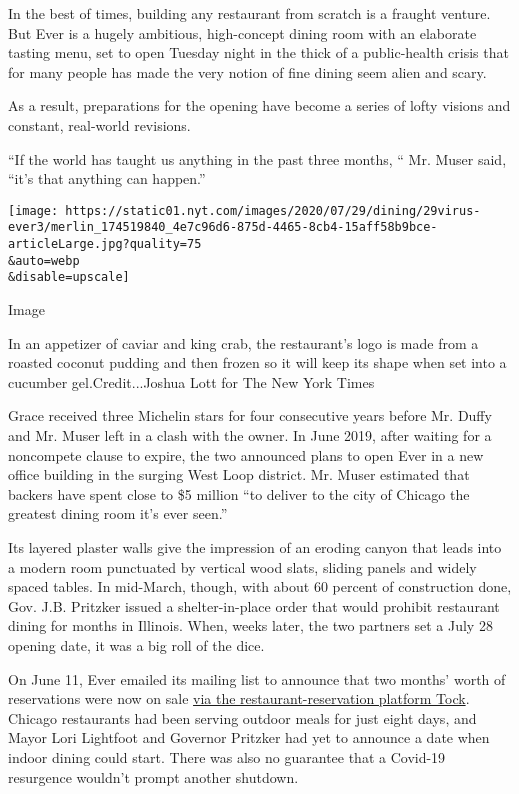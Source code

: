 In the best of times, building any restaurant from scratch is a fraught
venture. But Ever is a hugely ambitious, high-concept dining room with
an elaborate tasting menu, set to open Tuesday night in the thick of a
public-health crisis that for many people has made the very notion of
fine dining seem alien and scary.

As a result, preparations for the opening have become a series of lofty
visions and constant, real-world revisions.

``If the world has taught us anything in the past three months, `` Mr.
Muser said, ``it's that anything can happen.''

\texttt{[image: https://static01.nyt.com/images/2020/07/29/dining/29virus-ever3/merlin\_174519840\_4e7c96d6-875d-4465-8cb4-15aff58b9bce-articleLarge.jpg?quality=75\\\&auto=webp\\\&disable=upscale]}

Image

In an appetizer of caviar and king crab, the restaurant's logo is made
from a roasted coconut pudding and then frozen so it will keep its shape
when set into a cucumber gel.Credit...Joshua Lott for The New York Times

Grace received three Michelin stars for four consecutive years before
Mr. Duffy and Mr. Muser left in a clash with the owner. In June 2019,
after waiting for a noncompete clause to expire, the two announced plans
to open Ever in a new office building in the surging West Loop district.
Mr. Muser estimated that backers have spent close to \$5 million ``to
deliver to the city of Chicago the greatest dining room it's ever
seen.''

Its layered plaster walls give the impression of an eroding canyon that
leads into a modern room punctuated by vertical wood slats, sliding
panels and widely spaced tables. In mid-March, though, with about 60
percent of construction done, Gov. J.B. Pritzker issued a
shelter-in-place order that would prohibit restaurant dining for months
in Illinois. When, weeks later, the two partners set a July 28 opening
date, it was a big roll of the dice.

On June 11, Ever emailed its mailing list to announce that two months'
worth of reservations were now on sale
\href{https://www.exploretock.com/ever/}{via the restaurant-reservation
platform Tock}. Chicago restaurants had been serving outdoor meals for
just eight days, and Mayor Lori Lightfoot and Governor Pritzker had yet
to announce a date when indoor dining could start. There was also no
guarantee that a Covid-19 resurgence wouldn't prompt another shutdown.

